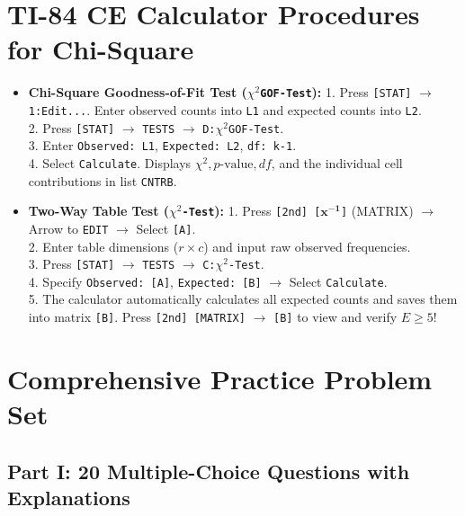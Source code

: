 \section{TI-84 CE Calculator Procedures for Chi-Square}
\begin{calculatorbox}
\begin{itemize}[leftmargin=1.2em]
  \item \textbf{Chi-Square Goodness-of-Fit Test (\texttt{$\chi^2$GOF-Test}):}
  1. Press \texttt{[STAT]} $\to$ \texttt{1:Edit...}. Enter observed counts into \texttt{L1} and expected counts into \texttt{L2}.\\
  2. Press \texttt{[STAT]} $\to$ \texttt{TESTS} $\to$ \texttt{D:$\chi^2$GOF-Test}.\\
  3. Enter \texttt{Observed: L1}, \texttt{Expected: L2}, \texttt{df: k-1}.\\
  4. Select \texttt{Calculate}. Displays $\chi^2, p\text{-value}, df$, and the individual cell contributions in list \texttt{CNTRB}.
  \item \textbf{Two-Way Table Test (\texttt{$\chi^2$-Test}):}
  1. Press \texttt{[2nd] [$\mathbf{x^{-1}}$]} (MATRIX) $\to$ Arrow to \texttt{EDIT} $\to$ Select \texttt{[A]}.\\
  2. Enter table dimensions ($r \times c$) and input raw observed frequencies.\\
  3. Press \texttt{[STAT]} $\to$ \texttt{TESTS} $\to$ \texttt{C:$\chi^2$-Test}.\\
  4. Specify \texttt{Observed: [A]}, \texttt{Expected: [B]} $\to$ Select \texttt{Calculate}.\\
  5. The calculator automatically calculates all expected counts and saves them into matrix \texttt{[B]}. Press \texttt{[2nd] [MATRIX]} $\to$ \texttt{[B]} to view and verify $E \ge 5$!
\end{itemize}
\end{calculatorbox}

\section{Comprehensive Practice Problem Set}

\subsection*{Part I: 20 Multiple-Choice Questions with Explanations}

